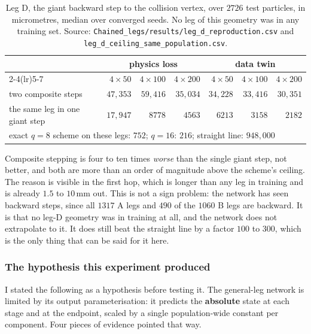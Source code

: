 \documentclass[11pt,a4paper]{article}
\newcommand{\mm}{\ensuremath{\,\mathrm{mm}}}
\begin{document}
\begin{table}[tbp]
  \centering
  \caption{Leg D, the giant backward step to the collision vertex, over $2726$
  test particles, in micrometres, median over converged seeds. No leg of this
  geometry was in any training set. Source:
  \texttt{Chained\_legs/results/leg\_d\_reproduction.csv} and
  \texttt{leg\_d\_ceiling\_same\_population.csv}.}
  \label{tab:legd-abs}
  \small
  \begin{tabular}{lrrrrrr}
    \toprule
    & \multicolumn{3}{c}{physics loss} & \multicolumn{3}{c}{data twin} \\
    \cmidrule(lr){2-4}\cmidrule(lr){5-7}
    & $4\times50$ & $4\times100$ & $4\times200$
    & $4\times50$ & $4\times100$ & $4\times200$ \\
    \midrule
    two composite steps & $47{,}353$ & $59{,}416$ & $35{,}034$
                        & $34{,}228$ & $33{,}416$ & $30{,}351$ \\
    the same leg in one giant step & $17{,}947$ & $8778$ & $4563$
                        & $6213$ & $3158$ & $2182$ \\
    \midrule
    \multicolumn{7}{l}{exact $q = 8$ scheme on these legs: $752$;
      $q = 16$: $216$; straight line: $948{,}000$} \\
    \bottomrule
  \end{tabular}
\end{table}

Composite stepping is four to ten times \emph{worse} than the single giant step,
not better, and both are more than an order of magnitude above the scheme's
ceiling. The reason is visible in the first hop, which is longer than any leg in
training and is already $1.5$ to $10\mm$ out. This is not a sign problem: the
network has seen backward steps, since all $1317$ A legs and $490$ of the $1060$
B legs are backward. It is that no leg-D geometry was in training at all, and
the network does not extrapolate to it. It does still beat the straight line by
a factor $100$ to $300$, which is the only thing that can be said for it here.

\subsubsection{The hypothesis this experiment produced}
\label{sec:hypothesis}

I stated the following as a hypothesis before testing it. The general-leg
network is limited by its output parameterisation: it predicts the
\textbf{absolute} state at each stage and at the endpoint, scaled by a single
population-wide constant per component. Four pieces of evidence pointed that
way.
\end{document}
